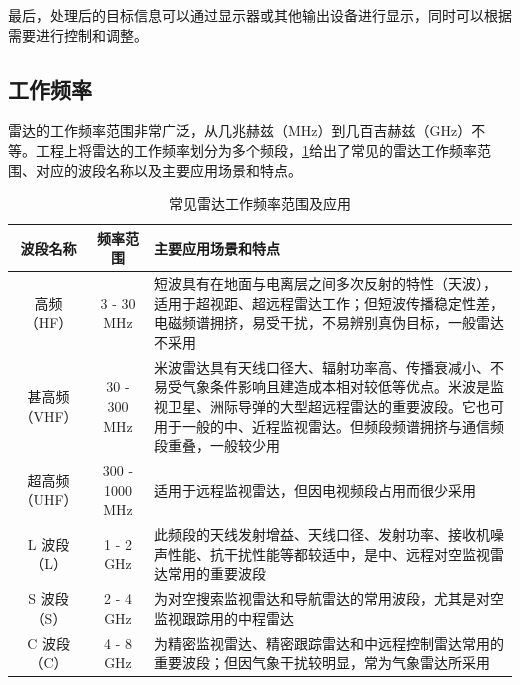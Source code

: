 最后，处理后的目标信息可以通过显示器或其他输出设备进行显示，同时可以根据需要进行控制和调整。

\subsection{工作频率}

雷达的工作频率范围非常广泛，从几兆赫兹（MHz）到几百吉赫兹（GHz）不等。工程上将雷达的工作频率划分为多个频段，\cref{tab_chp1_radar_frequency}给出了常见的雷达工作频率范围、对应的波段名称以及主要应用场景和特点。

\begin{table}[htb!]
    \centering
    \caption{常见雷达工作频率范围及应用}
    \label{tab_chp1_radar_frequency}
    \small
    \begin{tabular}{c|c|p{7cm}}
        \hline
        波段名称      & 频率范围           & 主要应用场景和特点                                                                                                     \\
        \hline
        \hline
        高频（HF）    & 3 - 30 MHz     & 短波具有在地面与电离层之间多次反射的特性（天波），适用于超视距、超远程雷达工作；但短波传播稳定性差，电磁频谱拥挤，易受干扰，不易辨别真伪目标，一般雷达不采用
        \\
        \hline
        甚高频（VHF）  & 30 - 300 MHz   & 米波雷达具有天线口径大、辐射功率高、传播衰减小、不易受气象条件影响且建造成本相对较低等优点。米波是监视卫星、洲际导弹的大型超远程雷达的重要波段。它也可用于一般的中、近程监视雷达。但频段频谱拥挤与通信频段重叠，一般较少用 \\
        \hline
        超高频（UHF）  & 300 - 1000 MHz & 适用于远程监视雷达，但因电视频段占用而很少采用                                                                                       \\
        \hline
        L 波段（L）   & 1 - 2 GHz      & 此频段的天线发射增益、天线口径、发射功率、接收机噪声性能、抗干扰性能等都较适中，是中、远程对空监视雷达常用的重要波段                                                    \\
        \hline
        S 波段（S）   & 2 - 4 GHz      & 为对空搜索监视雷达和导航雷达的常用波段，尤其是对空监视跟踪用的中程雷达                                                                           \\
        \hline
        C 波段（C）   & 4 - 8 GHz      & 为精密监视雷达、精密跟踪雷达和中远程控制雷达常用的重要波段；但因气象干扰较明显，常为气象雷达所采用                                                             \\

\end{tabular}
\end{table}
